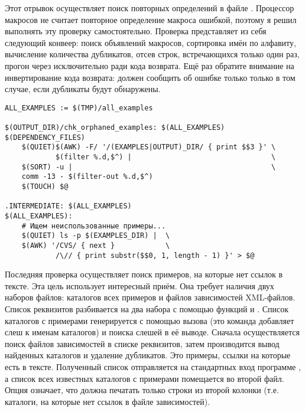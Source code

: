Этот отрывок осуществляет поиск повторных определений в файле
. Процессор макросов не считает повторное
определение макроса ошибкой, поэтому я решил выполнять эту проверку
самостоятельно. Проверка представляет из себя следующий конвеер: поиск
объявлений макросов, сортировка имён по алфавиту, вычисление
количества дубликатов, отсев строк, встречающихся только один раз,
прогон через  исключительно ради кода возврата. Ещё раз
обратите внимание на инвертирование кода возврата: \GNUmake{} должен
сообщить об ошибке только только в том случае, если дубликаты будут
обнаружены.

\begin{verbatim}
ALL_EXAMPLES := $(TMP)/all_examples

$(OUTPUT_DIR)/chk_orphaned_examples: $(ALL_EXAMPLES) $(DEPENDENCY_FILES)
    $(QUIET)$(AWK) -F/ '/(EXAMPLES|OUTPUT)_DIR/ { print $$3 }' \
            $(filter %.d,$^) |                                 \
    $(SORT) -u |                                               \
    comm -13 - $(filter-out %.d,$^)
    $(TOUCH) $@

.INTERMEDIATE: $(ALL_EXAMPLES)
$(ALL_EXAMPLES):
    # Ищем неиспользованные примеры...
    $(QUIET) ls -p $(EXAMPLES_DIR) |  \
    $(AWK) '/CVS/ { next }            \
            /\// { print substr($$0, 1, length - 1) }' > $@
\end{verbatim}

Последняя проверка осуществляет поиск примеров, на которые нет ссылок
в тексте. Эта цель использует интересный приём. Она требует наличия
двух наборов файлов: каталогов всех примеров и файлов зависимостей
XML-файлов. Список реквизитов разбивается на два набора с помощью
функций \function{filter} и \function{filter-out}. Список каталогов с
примерами генерируется с помощью вызова \command{ls -p} (это команда
добавляет слеш к именам каталогов) и поиска слешей в её
выводе. Сначала осуществляется поиск файлов зависимостей в списке
реквизитов, затем производится вывод найденных каталогов и удаление
дубликатов. Это примеры, ссылки на которые есть в тексте. Полученный
список отправляется на стандартных вход программе , а
список всех известных каталогов с примерами помещается во второй
файл. Опция \command{-13} означает, что \utility{comm} должна печатать
только строки из второй колонки (т.е. каталоги, на которые нет ссылок
в файле зависимостей).
